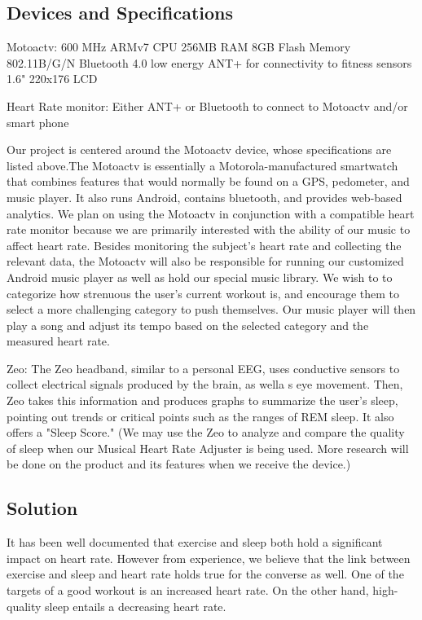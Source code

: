 \documentclass[letterpaper,english]{scrreprt}
\begin{document}
\subsection*{Devices and Specifications}
Motoactv:
600 MHz ARMv7 CPU
256MB RAM
8GB Flash Memory
802.11B/G/N
Bluetooth 4.0 low energy
ANT+ for connectivity to fitness sensors
1.6" 220x176 LCD

Heart Rate monitor:
Either ANT+ or Bluetooth to connect to Motoactv and/or smart phone

Our project is centered around the Motoactv device, whose specifications are listed above.The Motoactv is essentially a Motorola-manufactured smartwatch that combines features that would normally be found on a GPS, pedometer, and music player. It also runs Android, contains bluetooth, and provides web-based analytics. We plan on using the Motoactv in conjunction with a compatible heart rate monitor because we are primarily interested with the ability of our music to affect heart rate. Besides monitoring the subject's heart rate and collecting the relevant data, the Motoactv will also be responsible for running our customized Android music player as well as hold our special music library. We wish to to categorize how strenuous the user's current workout is, and encourage them to select a more challenging category to push themselves. Our music player will then play a song and adjust its tempo based on the selected category and the measured heart rate.

Zeo:
The Zeo headband, similar to a personal EEG, uses conductive sensors to collect electrical signals produced by the brain, as wella s eye movement. Then, Zeo takes this information and produces graphs to summarize the user's sleep, pointing out trends or critical points such as the ranges of REM sleep. It also offers a "Sleep Score." (We may use the Zeo to analyze and compare the quality of sleep when our Musical Heart Rate Adjuster is being used. More research will be done on the product and its features when we receive the device.)
			 
\subsection*{Solution}
It has been well documented that exercise and sleep both hold a significant impact on heart rate. However from experience, we believe that the link between exercise and sleep and heart rate holds true for the converse as well. One of the targets of a good workout is an increased heart rate. On the other hand, high-quality sleep entails a decreasing heart rate.
			 
\end{document}

